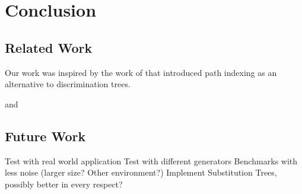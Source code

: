 \chapter{Conclusion}
\section{Related Work}
Our work was inspired by the work of \cite{noauthor_path-indexing_nodate} that introduced path indexing as an alternative to discrimination trees.


and \cite{mccune_experiments_1992}

\section{Future Work}
Test with real world application
Test with different generators
Benchmarks with less noise (larger size? Other environment?)
Implement Substitution Trees, possibly better in every respect?
